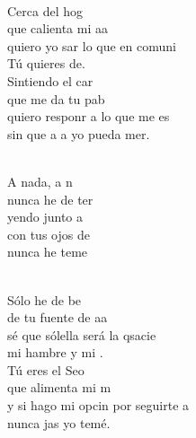 \begin{cancion}%
	       \chord{(}{**)}{    }\\
	Cerca del hog  \\
	que calienta mi aa \\
	quiero yo sar lo que en comuni\\
	Tú quieres de.\\
	Sintiendo el car \\
	que me da tu pab \\
	quiero responr a lo que me es\\
	sin que a a yo pueda mer.\\\jump\\
	\begin{chorus}%
	A nada, a n  \\
	nunca he de ter\\
	yendo junto a \\
	con tus ojos de \\
	nunca he  teme\\
	\end{chorus}%
	\jump\\
	Sólo he de be \\
	de tu fuente de aa \\
	sé que sólella será la qsacie\\
	mi hambre y mi .\\
	Tú eres el Seo \\
	que alimenta mi m \\
	y si hago mi opcin por seguirte a\\
	nunca jas yo temé.\\\jump\\

\end{cancion}
